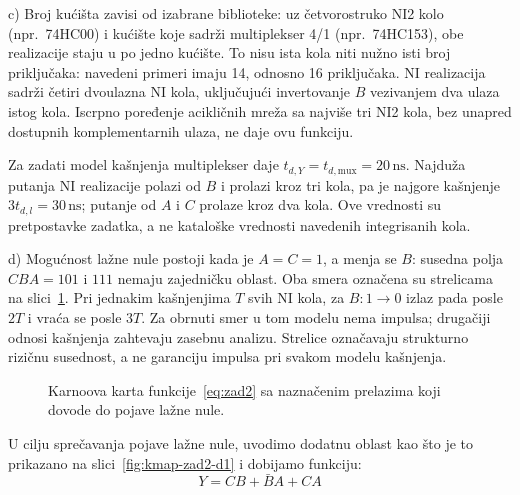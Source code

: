 \documentclass[a4paper,11pt]{article}
\numberwithin{equation}{section} %
\begin{document}
\noindent
c) Broj kućišta zavisi od izabrane biblioteke: uz četvorostruko NI2 kolo (npr.\ 74HC00) i kućište koje sadrži multiplekser 4/1 (npr.\ 74HC153), obe realizacije staju u po jedno kućište. To nisu ista kola niti nužno isti broj priključaka: navedeni primeri imaju 14, odnosno 16 priključaka. NI realizacija sadrži četiri dvoulazna NI kola, uključujući invertovanje $B$ vezivanjem dva ulaza istog kola. Iscrpno poređenje acikličnih mreža sa najviše tri NI2 kola, bez unapred dostupnih komplementarnih ulaza, ne daje ovu funkciju.

Za zadati model kašnjenja multiplekser daje $t_{d,Y}=t_{d,\mathrm{mux}}=20\,\mathrm{ns}$. Najduža putanja NI realizacije polazi od $B$ i prolazi kroz tri kola, pa je najgore kašnjenje $3t_{d,l}=30\,\mathrm{ns}$; putanje od $A$ i $C$ prolaze kroz dva kola. Ove vrednosti su pretpostavke zadatka, a ne kataloške vrednosti navedenih integrisanih kola.

\noindent\makebox[\linewidth]{\dotfill}

\noindent
d) Mogućnost lažne nule postoji kada je $A=C=1$, a menja se $B$: susedna polja $CBA=101$ i $111$ nemaju zajedničku oblast. Oba smera označena su strelicama na slici~\ref{fig:kmap-zad2-d}. Pri jednakim kašnjenjima $T$ svih NI kola, za $B:1\to0$ izlaz pada posle $2T$ i vraća se posle $3T$. Za obrnuti smer u tom modelu nema impulsa; drugačiji odnosi kašnjenja zahtevaju zasebnu analizu. Strelice označavaju strukturno rizičnu susednost, a ne garanciju impulsa pri svakom modelu kašnjenja.


\begin{figure}[!ht]
  \centering
  \captionsetup{skip=-1em} %

  \caption{Karnoova karta funkcije~\eqref{eq:zad2} sa naznačenim prelazima koji dovode do pojave lažne nule.}
  \label{fig:kmap-zad2-d}
\end{figure}
\noindent
U cilju sprečavanja pojave lažne nule, uvodimo dodatnu oblast kao \v{s}to je to prikazano na slici~\ref{fig:kmap-zad2-d1} i dobijamo funkciju:
\begin{equation}\label{eq:zad2-d1}
Y = C B + \bar{B} A + C A
\end{equation}
\end{document}

